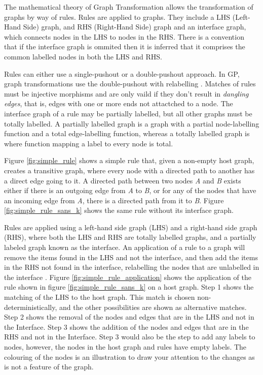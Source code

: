 \documentclass{UoYCSproject}
\begin{document}
The mathematical theory of Graph Transformation allows the transformation of graphs by way of rules. Rules are applied to graphs. They include a LHS (Left-Hand Side) graph, and RHS (Right-Hand Side) graph and an interface graph, which connects nodes in the LHS to nodes in the RHS. There is a convention that if the interface graph is ommited then it is inferred that it comprises the common labelled nodes in both the LHS and RHS.

Rules can either use a single-pushout or a double-pushout approach. In GP, graph transformations use the double-pushout with relabelling \cite[p. 100]{gp1}. Matches of rules must be injective morphisms and are only vaild if they don't result in \emph{dangling edges}, that is, edges with one or more ends not attactched to a node. The interface graph of a rule may be partially labelled, but all other graphs must be totally labelled. A partially labelled graph is a graph with a partial node-labelling function and a total edge-labelling function, whereas a totally labelled graph is where function mapping a label to every node is total.

Figure \ref{fig:simple_rule} shows a simple rule that, given a non-empty host graph, creates a transitive graph, where every node with a directed path to another has a direct edge going to it. A directed path between two nodes \emph{A} and \emph{B} exists either if there is an outgoing edge from \emph{A} to \emph{B}, or for any of the nodes that have an incoming edge from \emph{A}, there is a directed path from it to \emph{B}.
Figure \ref{fig:simple_rule_sans_k} shows the same rule without its interface graph.



Rules are applied using a left-hand side graph (LHS) and a right-hand side graph (RHS), where both the LHS and RHS are totally labelled graphs, and a partially labeled graph known as the interface. An application of a rule to a graph will remove the items found in the LHS and not the interface, and then add the items in the RHS not found in the interface, relabelling the nodes that are unlabelled in the interface \cite{gp_lang, gp2_design}. Figure \ref{fig:simple_rule_application} shows the application of the rule shown in figure \ref{fig:simple_rule_sans_k} on a host graph. Step 1 shows the matching of the LHS to the host graph. This match is chosen non-deterministically, and the other possibilities are shown as alternative matches. Step 2 shows the removal of the nodes and edges that are in the LHS and not in the Interface. Step 3 shows the addition of the nodes and edges that are in the RHS and not in the Interface. Step 3 would also be the step to add any labels to nodes, however, the nodes in the host graph and rules have empty labels. The colouring of the nodes is an illustration to draw your attention to the changes as is not a feature of the graph.
\end{document}
